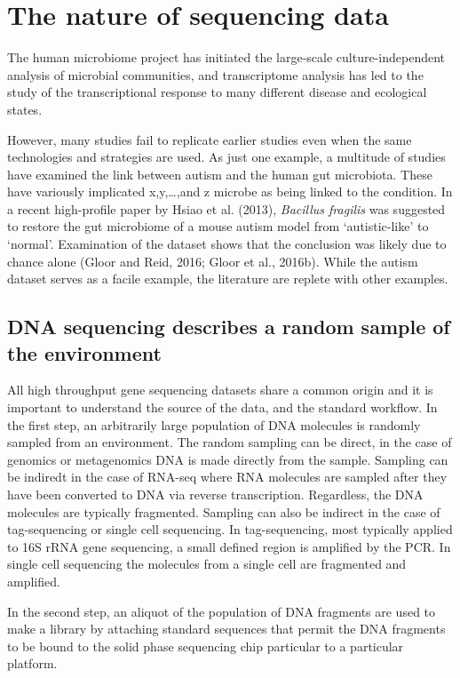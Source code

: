 \documentclass[twocolumn]{article}
\begin{document}
\section{The nature of sequencing
data}\label{the-nature-of-sequencing-data}

The human microbiome project has initiated the large-scale
culture-independent analysis of microbial communities, and transcriptome
analysis has led to the study of the transcriptional response to many
different disease and ecological states.

However, many studies fail to replicate earlier studies even when the
same technologies and strategies are used. As just one example, a
multitude of studies have examined the link between autism and the human
gut microbiota. These have variously implicated x,y,\ldots{},and z
microbe as being linked to the condition. In a recent high-profile paper
by Hsiao et al. (2013), \emph{Bacillus fragilis} was suggested to
restore the gut microbiome of a mouse autism model from `autistic-like'
to `normal'. Examination of the dataset shows that the conclusion was
likely due to chance alone (Gloor and Reid, 2016; Gloor et al., 2016b).
While the autism dataset serves as a facile example, the literature are
replete with other examples.

\subsection{DNA sequencing describes a random sample of the
environment}\label{dna-sequencing-describes-a-random-sample-of-the-environment}

All high throughput gene sequencing datasets share a common origin and
it is important to understand the source of the data, and the standard
workflow. In the first step, an arbitrarily large population of DNA
molecules is randomly sampled from an environment. The random sampling
can be direct, in the case of genomics or metagenomics DNA is made
directly from the sample. Sampling can be indiredt in the case of
RNA-seq where RNA molecules are sampled after they have been converted
to DNA via reverse transcription. Regardless, the DNA molecules are
typically fragmented. Sampling can also be indirect in the case of
tag-sequencing or single cell sequencing. In tag-sequencing, most
typically applied to 16S rRNA gene sequencing, a small defined region is
amplified by the PCR. In single cell sequencing the molecules from a
single cell are fragmented and amplified.

In the second step, an aliquot of the population of DNA fragments are
used to make a library by attaching standard sequences that permit the
DNA fragments to be bound to the solid phase sequencing chip particular
to a particular platform.
\end{document}
